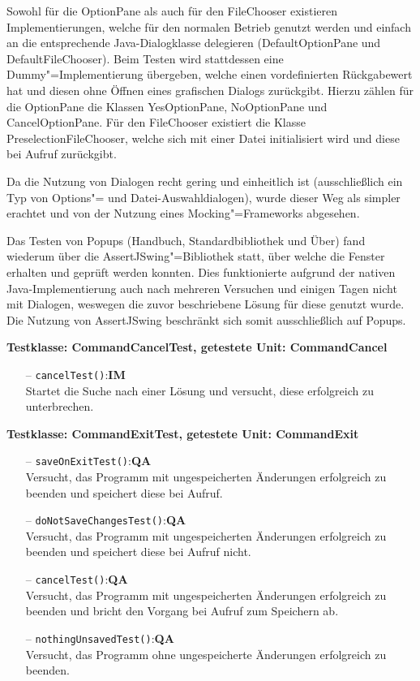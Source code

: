 \documentclass[parskip=full,11pt,twoside]{scrartcl}
\def\qa{\hfill\textbf{QA}}
\def\impl{\hfill\textbf{IM}}
\begin{document}
Sowohl für die OptionPane als auch für den FileChooser existieren Implementierungen, welche für den normalen Betrieb genutzt werden und einfach an die entsprechende Java-Dialogklasse delegieren (DefaultOptionPane und DefaultFileChooser). Beim Testen wird stattdessen eine Dummy"=Implementierung übergeben, welche einen vordefinierten Rückgabewert hat und diesen ohne Öffnen eines grafischen Dialogs zurückgibt. Hierzu zählen für die OptionPane die Klassen YesOptionPane, NoOptionPane und CancelOptionPane. Für den FileChooser existiert die Klasse PreselectionFileChooser, welche sich mit einer Datei initialisiert wird und diese bei Aufruf zurückgibt.

Da die Nutzung von Dialogen recht gering und einheitlich ist (ausschließlich ein Typ von Options"= und Datei-Auswahldialogen), wurde dieser Weg als simpler erachtet und von der Nutzung eines Mocking"=Frameworks abgesehen.

Das Testen von Popups (Handbuch, Standardbibliothek und Über) fand wiederum über die AssertJSwing"=Bibliothek statt, über welche die Fenster erhalten und geprüft werden konnten. Dies funktionierte aufgrund der nativen Java-Implementierung auch nach mehreren Versuchen und einigen Tagen nicht mit Dialogen, weswegen die zuvor beschriebene Lösung für diese genutzt wurde. Die Nutzung von AssertJSwing beschränkt sich somit ausschließlich auf Popups.

\textbf{Testklasse: CommandCancelTest, getestete Unit: CommandCancel}
\begin{itemize}
	\item[--] \texttt{cancelTest()}:\impl\\
	Startet die Suche nach einer Lösung und versucht, diese erfolgreich zu unterbrechen.
\end{itemize}

\textbf{Testklasse: CommandExitTest, getestete Unit: CommandExit}
\begin{itemize}
	\item[--] \texttt{saveOnExitTest()}:\qa\\
	Versucht, das Programm mit ungespeicherten Änderungen erfolgreich zu beenden und speichert diese bei Aufruf.
	\item[--] \texttt{doNotSaveChangesTest()}:\qa\\
	Versucht, das Programm mit ungespeicherten Änderungen erfolgreich zu beenden und speichert diese bei Aufruf nicht.
	\item[--] \texttt{cancelTest()}:\qa\\
	Versucht, das Programm mit ungespeicherten Änderungen erfolgreich zu beenden und bricht den Vorgang bei Aufruf zum Speichern ab.
	\item[--] \texttt{nothingUnsavedTest()}:\qa\\
	Versucht, das Programm ohne ungespeicherte Änderungen erfolgreich zu beenden.
\end{itemize}
\end{document}
